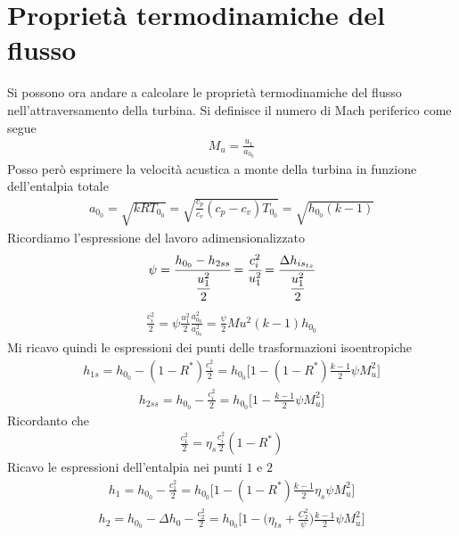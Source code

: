 \section{Proprietà termodinamiche del flusso}
Si possono ora andare a calcolare le proprietà termodinamiche del flusso nell'attraversamento della turbina. Si definisce il numero di Mach periferico come segue
\begin{align*}
M_u = \frac{u_1}{a_{0_0}}
\end{align*}
Posso però esprimere la velocità acustica a monte della turbina in funzione dell'entalpia totale
\begin{align*}
a_{0_0} = \sqrt{kRT_{0_0}} = \sqrt{\frac{c_p}{c_v} \left( c_p - c_v \right) T_{0_0}} = \sqrt{h_{0_0} \left( k - 1 \right)}
\end{align*}
Ricordiamo l'espressione del lavoro adimensionalizzato
\begin{align*}
\psi = \cfrac{h_{0_0} - h_{2ss}}{\cfrac{u_1^2}{2}} = \cfrac{c_i^2}{u_1^2} = \cfrac{\Delta h_{is_{ts}}}{\cfrac{u_1^2}{2}}
\end{align*}
\begin{align*}
\frac{c_i^2}{2} = \psi \frac{u_1^2}{2} \frac{a_{0_0}^2}{a_{0_0}^2} = \frac{\psi}{2} Mu^2 (k-1) h_{0_0}
\end{align*}
Mi ricavo quindi le espressioni dei punti delle trasformazioni isoentropiche
\begin{align*}
h_{1s} = h_{0_0} - \left(1- R^* \right) \frac{c_i^2}{2} = h_{0_0} \bigg[ 1- \left( 1- R^* \right) \frac{k-1}{2} \psi M_u^2 \bigg]
\end{align*}
\begin{align*}
h_{2ss} = h_{0_0} - \frac{c_i^2}{2} = h_{0_0} \bigg[ 1 - \frac{k-1}{2} \psi M_u^2 \bigg]
\end{align*}
Ricordanto che
\begin{align*}
\frac{c_1^2}{2} = \eta_s \frac{c_i^2}{2} \left( 1- R^* \right)
\end{align*}
Ricavo le espressioni dell'entalpia nei punti $1$ e $2$
\begin{align*}
h_1 = h_{0_0} - \frac{c_1^2}{2} = h_{0_0} \bigg[ 1- \left( 1- R^* \right) \frac{k-1}{2} \eta_s \psi M_u^2 \bigg]
\end{align*}
\begin{align*}
h_2 = h_{0_0} - \Delta h_0 - \frac{c_2^2}{2} = h_{0_0} \bigg[ 1- \bigg( \eta_{ts} + \frac{C_2^2}{\psi} \bigg) \frac{k-1}{2} \psi M_u^2 \bigg]
\end{align*}


